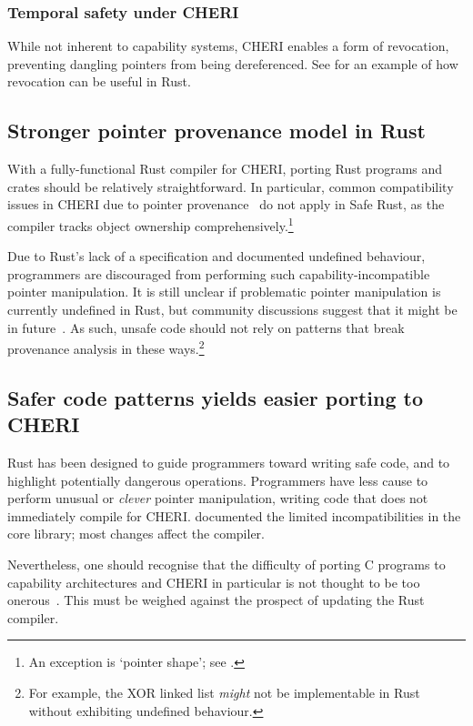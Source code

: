 \documentclass[dissertation.tex]{subfiles}
\begin{document}
\subsubsection{Temporal safety under CHERI}
While not inherent to capability systems, CHERI enables a form of
revocation, preventing dangling pointers from being dereferenced.
See  for an example of how revocation
can be useful in Rust.


\subsection{Stronger pointer provenance model in Rust}
\label{sec:eval-cheri-provenance}

With a fully-functional Rust compiler for CHERI, porting Rust programs
and crates should be relatively straightforward.
In particular, common compatibility issues in CHERI due to pointer
provenance~\cite{cheri-2019-abstract} do not apply in Safe Rust,
as the compiler tracks object ownership comprehensively.\footnote{
An exception is `pointer shape'; see .
}

Due to Rust's lack of a specification and documented undefined
behaviour, programmers are discouraged from performing such
capability-incompatible pointer manipulation.
It is still unclear if problematic pointer manipulation is currently
undefined in Rust, but community discussions suggest that it might be in
future~\cite{rust-ucg-provenance}.
As such, unsafe code should not rely on patterns that break provenance
analysis in these ways.\footnote{
For example, the XOR linked list \emph{might} not be implementable
in Rust without exhibiting undefined behaviour.
}


\subsection{Safer code patterns yields easier porting to CHERI}
\label{sec:eval-cheri-port}

Rust has been designed to guide programmers toward writing safe code,
and to highlight potentially dangerous operations.
Programmers have less cause to perform unusual or \emph{clever} pointer
manipulation, writing code that does not immediately compile for CHERI.
 documented the limited incompatibilities in the
core library; most changes affect the compiler.

Nevertheless, one should recognise that the difficulty of porting C
programs to capability architectures and CHERI in particular is not
thought to be too onerous~\cite{capsicum-usability}.
This must be weighed against the prospect of updating the Rust compiler.
\end{document}

